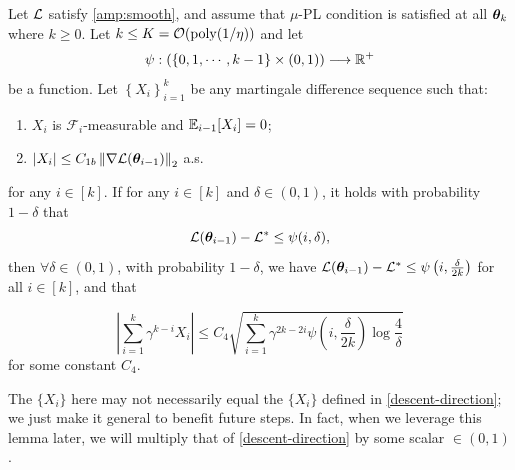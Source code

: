 \begin{lemma}\label{martingale-bound-by-L}Let $\mathcal{L}$ satisfy \cref{amp:smooth}, and assume that $\mu$-PL condition is satisfied at all ${\bm{\theta}}_k$ where $k \geq 0$. Let $k \leq K = \mathcal{O}(\mathrm{poly}(1/\eta))$
     and let \begin{align*}\psi: \left(\{0,1,\cdots,k-1\}\times (0,1)\right) \longrightarrow \mathbb{R}^+\end{align*} be a function. Let $\left\{X_i\right\}_{i=1}^{k}$ be any martingale difference sequence such that: \begin{enumerate}
         \item $X_i$ is $\mathcal{F}_{i}$-measurable and $\mathbb{E}_{i-1}[X_i] = 0$;
         \item $\left|X_i\right| \leq C_{1b}\left\|\nabla\mathcal{L}({\bm{\theta}}_{i-1})\right\|_2$ a.s.
     \end{enumerate} for any $i \in [k]$. If for any $i \in [k]$ and $\delta \in (0, 1)$, it holds with probability $1-\delta$ that $$\mathcal{L}({\bm{\theta}}_{i-1})-\mathcal{L}^* \leq \psi(i, \delta),$$
then $\forall \delta \in (0, 1)$, with probability $1-\delta$, we have $\mathcal{L}({\bm{\theta}}_{i-1})-\mathcal{L}^* \leq \psi\left(i, \frac{\delta}{2k}\right)$ for all $i \in [k]$, and that


$$\left|\sum_{i=1}^{k}\gamma^{k-i}X_i\right| \leq C_4\sqrt{\sum_{i=1}^{k}\gamma^{2k-2i} \psi\left(i,\frac{\delta}{2k}\right)\log\frac{4}{\delta}}$$
for some constant $C_4$.
\end{lemma}
\begin{remark}
    The $\{X_i\}$ here may not necessarily equal the $\{X_i\}$ defined in \cref{descent-direction}; we just make it general to benefit future steps. In fact, when we leverage this lemma later, we will multiply that of \cref{descent-direction} by some scalar $\in (0, 1)$.
\end{remark}  
